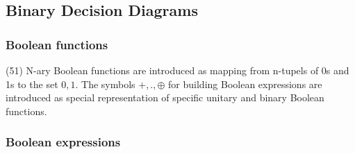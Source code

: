 %
%
%
%
%

\subsection{Binary Decision Diagrams}

\subsubsection{Boolean functions}
\label{tut:51}

(51) N-ary Boolean functions are introduced as mapping from n-tupels of 0s and 1s to the set ${0,1}$.
The symbols $+,.,\oplus$ for building Boolean expressions are introduced as special representation of
specific unitary and binary Boolean functions.


\subsubsection{Boolean expressions}
\label{tut:52}

